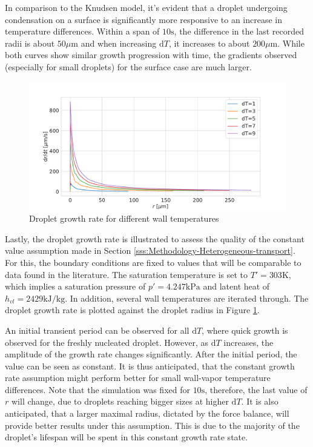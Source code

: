 \documentclass[12pt]{article}
\numberwithin{equation}{section}
\begin{document}
In comparison to the Knudsen model, it's evident that a droplet undergoing condensation on a surface is significantly more responsive to an increase in temperature differences. Within a span of $10\mathrm{s}$, the difference in the last recorded radii is about $50\mu\mathrm{m}$ and when increasing $\mathrm{d}T$, it increases to about $200\mu\mathrm{m}$. While both curves show similar growth progression with time, the gradients observed (especially for small droplets) for the surface case are much larger.
\begin{figure}[H]
    \centering
    \includegraphics[trim={0 0 0 40},clip,width=1.0\textwidth]{Figures/drdt_const_assumption.pdf}
    \caption{Droplet growth rate for different wall temperatures}
    \label{f:drdt_het_constant}
\end{figure}
Lastly, the droplet growth rate is illustrated to assess the quality of the constant value assumption made in Section \ref{sss:Methodology-Heterogeneous-transport}. For this, the boundary conditions are fixed to values that will be comparable to data found in the literature. The saturation temperature is set to $T'=303\mathrm{K}$, which implies a saturation pressure of $p'=4.247\mathrm{kPa}$ and latent heat of $h_{vl}=2429\mathrm{kJ/kg}$. In addition, several wall temperatures are iterated through. The droplet growth rate is plotted against the droplet radius in Figure \ref{f:drdt_het_constant}.

An initial transient period can be observed for all $\mathrm{d}T$, where quick growth is observed for the freshly nucleated droplet. However, as $\mathrm{d}T$ increases, the amplitude of the growth rate changes significantly. After the initial period, the value can be seen as constant. It is thus anticipated, that the constant growth rate assumption might perform better for small wall-vapor temperature differences. Note that the simulation was fixed for $10\mathrm{s}$, therefore, the last value of $r$ will change, due to droplets reaching bigger sizes at higher $\mathrm{d}T$. It is also anticipated, that a larger maximal radius, dictated by the force balance, will provide better results under this assumption. This is due to the majority of the droplet's lifespan will be spent in this constant growth rate state.     
\end{document}
